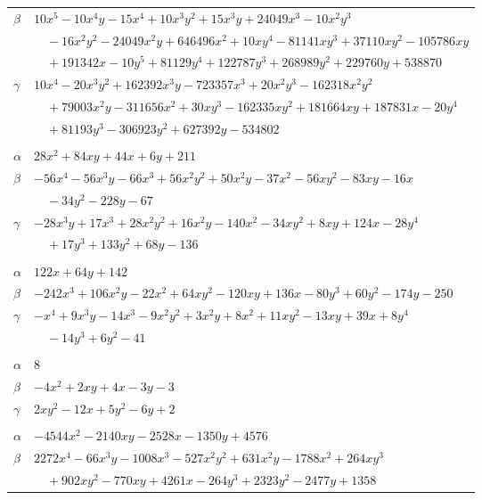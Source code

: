 \documentclass[11pt]{article}
\begin{document}
\begin{longtable}{@{}ll@{}}
$\beta$ & $10x^{5}-10x^{4}y-15x^{4}+10x^{3}y^{2}+15x^{3}y+24049x^{3}-10x^{2}y^{3}$\\
 & $\quad -16x^{2}y^{2}-24049x^{2}y+646496x^{2}+10xy^{4}-81141xy^{3}+37110xy^{2}-105786xy$\\
 & $\quad +191342x-10y^{5}+81129y^{4}+122787y^{3}+268989y^{2}+229760y+538870$\\
$\gamma$ & $10x^{4}-20x^{3}y^{2}+162392x^{3}y-723357x^{3}+20x^{2}y^{3}-162318x^{2}y^{2}$\\
 & $\quad +79003x^{2}y-311656x^{2}+30xy^{3}-162335xy^{2}+181664xy+187831x-20y^{4}$\\
 & $\quad +81193y^{3}-306923y^{2}+627392y-534802$\\
\addlinespace[3pt]
\multicolumn{2}{@{}l}{$\{i,j\}=\{3,182\}$, $k_{ij}=2\cdot 3^{3}\cdot 13$}\\
$\alpha$ & $28x^{2}+84xy+44x+6y+211$\\
$\beta$ & $-56x^{4}-56x^{3}y-66x^{3}+56x^{2}y^{2}+50x^{2}y-37x^{2}-56xy^{2}-83xy-16x$\\
 & $\quad -34y^{2}-228y-67$\\
$\gamma$ & $-28x^{3}y+17x^{3}+28x^{2}y^{2}+16x^{2}y-140x^{2}-34xy^{2}+8xy+124x-28y^{4}$\\
 & $\quad +17y^{3}+133y^{2}+68y-136$\\
\addlinespace[3pt]
\multicolumn{2}{@{}l}{$\{i,j\}=\{3,197\}$, $k_{ij}=2^{3}\cdot 3^{2}\cdot 7$}\\
$\alpha$ & $122x+64y+142$\\
$\beta$ & $-242x^{3}+106x^{2}y-22x^{2}+64xy^{2}-120xy+136x-80y^{3}+60y^{2}-174y-250$\\
$\gamma$ & $-x^{4}+9x^{3}y-14x^{3}-9x^{2}y^{2}+3x^{2}y+8x^{2}+11xy^{2}-13xy+39x+8y^{4}$\\
 & $\quad -14y^{3}+6y^{2}-41$\\
\addlinespace[3pt]
\multicolumn{2}{@{}l}{$\{i,j\}=\{4,36\}$, $k_{ij}=3\cdot 7$}\\
$\alpha$ & $8$\\
$\beta$ & $-4x^{2}+2xy+4x-3y-3$\\
$\gamma$ & $2xy^{2}-12x+5y^{2}-6y+2$\\
\addlinespace[3pt]
\multicolumn{2}{@{}l}{$\{i,j\}=\{4,49\}$, $k_{ij}=2^{2}\cdot 3^{2}\cdot 7^{3}$}\\
$\alpha$ & $-4544x^{2}-2140xy-2528x-1350y+4576$\\
$\beta$ & $2272x^{4}-66x^{3}y-1008x^{3}-527x^{2}y^{2}+631x^{2}y-1788x^{2}+264xy^{3}$\\
 & $\quad +902xy^{2}-770xy+4261x-264y^{3}+2323y^{2}-2477y+1358$\\

\end{longtable}
\end{document}
